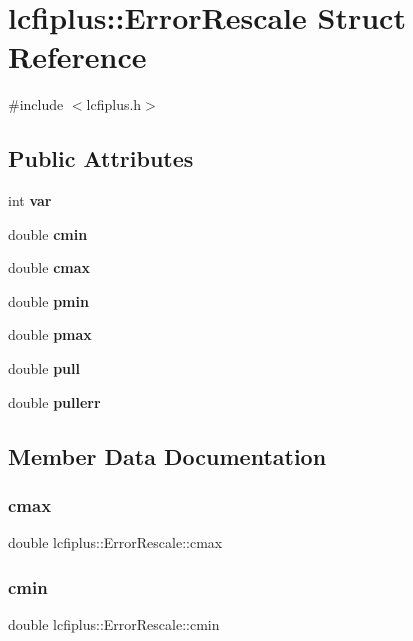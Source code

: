 \section{lcfiplus\+:\+:Error\+Rescale Struct Reference}
\label{structlcfiplus_1_1ErrorRescale}


{\ttfamily \#include $<$lcfiplus.\+h$>$}

\subsection*{Public Attributes}
\begin{DoxyCompactItemize}
\item 
int \textbf{ var}
\item 
double \textbf{ cmin}
\item 
double \textbf{ cmax}
\item 
double \textbf{ pmin}
\item 
double \textbf{ pmax}
\item 
double \textbf{ pull}
\item 
double \textbf{ pullerr}
\end{DoxyCompactItemize}


\subsection{Member Data Documentation}
\mbox{\label{structlcfiplus_1_1ErrorRescale_a2e468f42da6424992c0fbee16938e7b1}} 
\subsubsection{cmax}
{\footnotesize\ttfamily double lcfiplus\+::\+Error\+Rescale\+::cmax}

\mbox{\label{structlcfiplus_1_1ErrorRescale_a40049a453e53cfdf6624b0448aa54fd8}} 
\subsubsection{cmin}
{\footnotesize\ttfamily double lcfiplus\+::\+Error\+Rescale\+::cmin}

\mbox{\label{structlcfiplus_1_1ErrorRescale_a76b9795b08a35ff601045717a98ecaa1}} 
